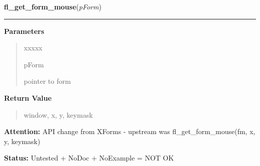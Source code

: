 \hspace{.8\funcindent}\begin{boxedminipage}{\funcwidth}

    \raggedright \textbf{fl\_get\_form\_mouse}(\textit{pForm})

    \vspace{-1.5ex}

    \rule{\textwidth}{0.5\fboxrule}
\setlength{\parskip}{2ex}
\setlength{\parskip}{1ex}
      \textbf{Parameters}
      \vspace{-1ex}

      \begin{quote}
        \begin{Ventry}{xxxxx}

          \item[pForm]

          pointer to form

        \end{Ventry}

      \end{quote}

      \textbf{Return Value}
    \vspace{-1ex}

      \begin{quote}
      window, x, y, keymask

      \end{quote}

\textbf{Attention:} API change from XForms - upstream was fl\_get\_form\_mouse(fm, x, y, 
keymask)



\textbf{Status:} Untested + NoDoc + NoExample = NOT OK



    \end{boxedminipage}

    \label{xformslib:library:fl_win_to_form}

    \vspace{0.5ex}

